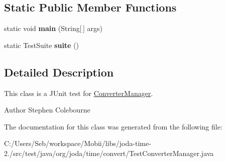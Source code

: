 \subsection*{Static Public Member Functions}
\begin{DoxyCompactItemize}
\item 
\hypertarget{classorg_1_1joda_1_1time_1_1convert_1_1_test_converter_manager_ae30aa070afe9dd47cfa294291143c347}{static void {\bfseries main} (String\mbox{[}$\,$\mbox{]} args)}\label{classorg_1_1joda_1_1time_1_1convert_1_1_test_converter_manager_ae30aa070afe9dd47cfa294291143c347}

\item 
\hypertarget{classorg_1_1joda_1_1time_1_1convert_1_1_test_converter_manager_a6451b640112e9560ca2cab01be01de16}{static Test\-Suite {\bfseries suite} ()}\label{classorg_1_1joda_1_1time_1_1convert_1_1_test_converter_manager_a6451b640112e9560ca2cab01be01de16}

\end{DoxyCompactItemize}


\subsection{Detailed Description}
This class is a J\-Unit test for \hyperlink{classorg_1_1joda_1_1time_1_1convert_1_1_converter_manager}{Converter\-Manager}.

\begin{DoxyAuthor}{Author}
Stephen Colebourne 
\end{DoxyAuthor}


The documentation for this class was generated from the following file\-:\begin{DoxyCompactItemize}
\item 
C\-:/\-Users/\-Seb/workspace/\-Mobii/libs/joda-\/time-\/2./src/test/java/org/joda/time/convert/Test\-Converter\-Manager.\-java\end{DoxyCompactItemize}
